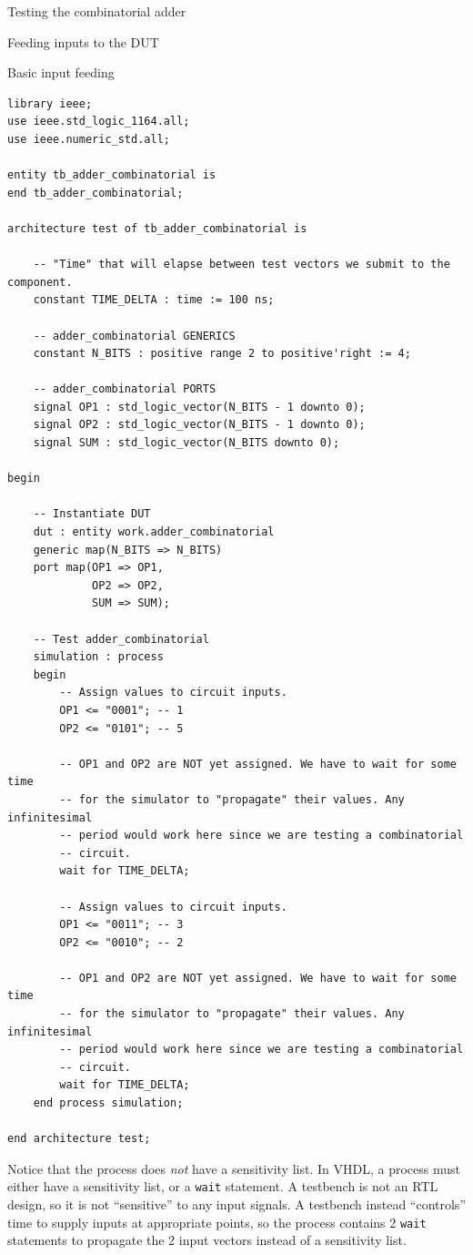 \documentclass[lab]{course}
\begin{document}
\begin{section}{Testing the combinatorial adder}
\begin{subsection}{Feeding inputs to the DUT}
\begin{subsubsection}{Basic input feeding}
            \begin{lstlisting}[caption={Simulation process (basic)}, captionpos=b, label={lst:combinatorial_simulation_process_1_test_vector}]
library ieee;
use ieee.std_logic_1164.all;
use ieee.numeric_std.all;

entity tb_adder_combinatorial is
end tb_adder_combinatorial;

architecture test of tb_adder_combinatorial is

    -- "Time" that will elapse between test vectors we submit to the component.
    constant TIME_DELTA : time := 100 ns;

    -- adder_combinatorial GENERICS
    constant N_BITS : positive range 2 to positive'right := 4;

    -- adder_combinatorial PORTS
    signal OP1 : std_logic_vector(N_BITS - 1 downto 0);
    signal OP2 : std_logic_vector(N_BITS - 1 downto 0);
    signal SUM : std_logic_vector(N_BITS downto 0);

begin

    -- Instantiate DUT
    dut : entity work.adder_combinatorial
    generic map(N_BITS => N_BITS)
    port map(OP1 => OP1,
             OP2 => OP2,
             SUM => SUM);

    -- Test adder_combinatorial
    simulation : process
    begin
        -- Assign values to circuit inputs.
        OP1 <= "0001"; -- 1
        OP2 <= "0101"; -- 5

        -- OP1 and OP2 are NOT yet assigned. We have to wait for some time
        -- for the simulator to "propagate" their values. Any infinitesimal
        -- period would work here since we are testing a combinatorial
        -- circuit.
        wait for TIME_DELTA;

        -- Assign values to circuit inputs.
        OP1 <= "0011"; -- 3
        OP2 <= "0010"; -- 2

        -- OP1 and OP2 are NOT yet assigned. We have to wait for some time
        -- for the simulator to "propagate" their values. Any infinitesimal
        -- period would work here since we are testing a combinatorial
        -- circuit.
        wait for TIME_DELTA;
    end process simulation;

end architecture test;
            \end{lstlisting}
        \end{subsubsection}

        Notice that the process does \emph{not} have a sensitivity list. In VHDL, a process must either have a sensitivity list, or a \verb+wait+ statement. A testbench is not an RTL design, so it is not ``sensitive'' to any input signals. A testbench instead ``controls'' time to supply inputs at appropriate points, so the process contains 2 \verb+wait+ statements to propagate the 2 input vectors instead of a sensitivity list. \\


\end{subsection}
\end{section}
\end{document}
